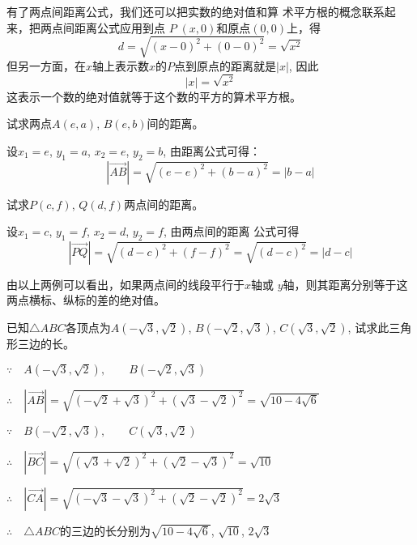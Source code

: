 有了两点间距离公式，我们还可以把实数的绝对值和算
术平方根的概念联系起来，把两点间距离公式应用到点
$P\; (x,0)$和原点$(0,0)$上，得
\[d=\sqrt{(x-0)^2+(0-0)^2}=\sqrt{x^2}\]
但另一方面，在$x$轴上表示数$x$的$P$点到原点的距离就是$|x|$, 
因此
\[|x|=\sqrt{x^2}\]
这表示一个数的绝对值就等于这个数的平方的算术平方根。

\begin{example}
    试求两点$A(e,a)$, $B(e,b)$间的距离。
\end{example}

\begin{solution}
    设$x_1=e$, $y_1=a$, $x_2=e$, $y_2=b$, 由距离公式可得：
\[|\Vec{AB}|=\sqrt{(e-e)^2+(b-a)^2}=|b-a|\]
\end{solution}

\begin{example}
    试求$P(c,f)$, $Q(d,f)$两点间的距离。
\end{example}


\begin{solution}
    设$x_1=c$, $y_1=f$, $x_2=d$, $y_2=f$, 由两点间的距离
公式可得
\[|\Vec{PQ}|=\sqrt{(d-c)^2+(f-f)^2}=\sqrt{(d-c)^2}=|d-c|\]
\end{solution}

由以上两例可以看出，如果两点间的线段平行于$x$轴或
$y$轴，则其距离分别等于这两点横标、纵标的差的绝对值。


\begin{example}
    已知$\triangle ABC$各顶点为$A(-\sqrt{3},\sqrt{2})$,
$B(-\sqrt{2},\sqrt{3})$, $C(\sqrt{3},\sqrt{2})$, 试求此三角形三边的长。
\end{example}

\begin{solution}
$\because\quad A(-\sqrt{3},\sqrt{2}),\qquad B(-\sqrt{2},\sqrt{3})$

$\therefore\quad |\Vec{AB}|=\sqrt{\left(-\sqrt{2}+\sqrt{3}\right)^2+\left(\sqrt{3}-\sqrt{2}\right)^2}=\sqrt{10-4\sqrt{6}}$

$\because\quad B(-\sqrt{2},\sqrt{3}),\qquad C(\sqrt{3},\sqrt{2})$

$\therefore\quad |\Vec{BC}|=\sqrt{\left(\sqrt{3}+\sqrt{2}\right)^2+\left(\sqrt{2}-\sqrt{3}\right)^2}=\sqrt{10}$

$\therefore\quad |\Vec{CA}|=\sqrt{\left(-\sqrt{3}-\sqrt{3}\right)^2+\left(\sqrt{2}-\sqrt{2}\right)^2}=2\sqrt{3}$

$\therefore\quad \triangle ABC$的三边的长分别为$\sqrt{10-4\sqrt{6}}$, $\sqrt{10}$, $2\sqrt{3}$
\end{solution}


